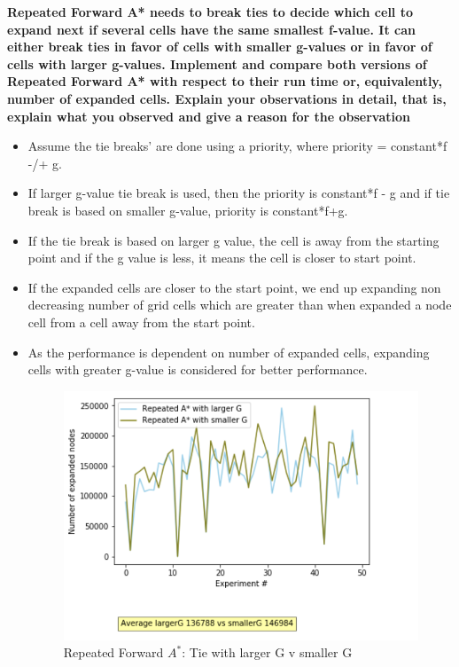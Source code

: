 \documentclass[a4 paper]{article}
\begin{document}

\textbf{\hspace{-15pt}Repeated Forward A* needs to break ties to decide which cell to expand next if
several cells have the same smallest f-value. It can either break ties in favor of cells with smaller g-values or in favor of
cells with larger g-values. Implement and compare both versions of Repeated Forward A* with respect to their run time or,
equivalently, number of expanded cells. Explain your observations in detail, that is, explain what you observed and give a
reason for the observation}

\begin{itemize}
    \item Assume the tie breaks' are done using a priority, where priority = constant*f -/+ g. 
    \item If larger g-value tie break is used, then the priority is constant*f - g and if tie break is based on smaller g-value, priority is constant*f+g.
    \item If the tie break is based on larger g value, the cell is away from the starting point and if the g value is less, it means the cell is closer to start point.
    \item If the expanded cells are closer to the start point, we end up expanding non decreasing number of grid cells which are greater than when expanded a node cell from a cell away from the start point. 
    \item As the performance is dependent on number of expanded cells, expanding cells with greater g-value is considered for better performance.
    
    \begin{figure}[H]
        \centering
        \includegraphics[scale=0.5]{smallerGvsLargerG.png}
        \caption{Repeated Forward $A^*$: Tie with larger G v smaller G}
        \label{Repeated Forward A^*: Tie with larger G v smaller G}
    \end{figure}

\end{itemize}
\end{document}
